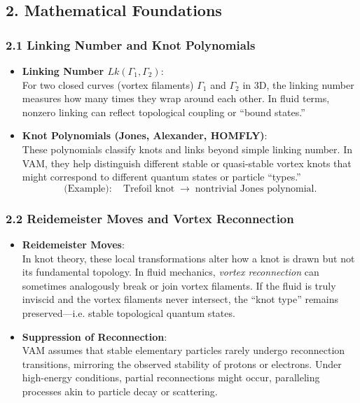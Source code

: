 \documentclass[aps,preprint,superscriptaddress]{revtex4-2}
\begin{document}
    \subsection*{2. Mathematical Foundations}

    \subsubsection*{2.1 Linking Number and Knot Polynomials}

    \begin{itemize}
        \item \textbf{Linking Number \(Lk(\Gamma_1, \Gamma_2)\)}: \\
    For two closed curves (vortex filaments) \(\Gamma_1\) and \(\Gamma_2\) in 3D, the linking number measures how many times they wrap around each other. In fluid terms, nonzero linking can reflect topological coupling or “bound states.”
        \item \textbf{Knot Polynomials (Jones, Alexander, HOMFLY)}: \\
    These polynomials classify knots and links beyond simple linking number. In VAM, they help distinguish different stable or quasi-stable vortex knots that might correspond to different quantum states or particle “types.”
    \[
        \text{(Example)}:\quad
        \text{Trefoil knot}\;\longrightarrow\;\text{nontrivial Jones polynomial.}
    \]
    \end{itemize}

    \subsubsection*{2.2 Reidemeister Moves and Vortex Reconnection}

    \begin{itemize}
        \item \textbf{Reidemeister Moves}: \\
        In knot theory, these local transformations alter how a knot is drawn but not its fundamental topology. In fluid mechanics, \textit{vortex reconnection} can sometimes analogously break or join vortex filaments. If the fluid is truly inviscid and the vortex filaments never intersect, the “knot type” remains preserved—i.e. stable topological quantum states.
        \item \textbf{Suppression of Reconnection}: \\
    VAM assumes that stable elementary particles rarely undergo reconnection transitions, mirroring the observed stability of protons or electrons. Under high-energy conditions, partial reconnections might occur, paralleling processes akin to particle decay or scattering.
    \end{itemize}
\end{document}
